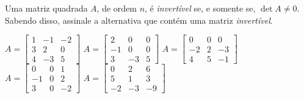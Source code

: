 Uma matriz quadrada $A$, de ordem $n$, é {\it invertível} se, e somente se, $\det A\neq 0$. Sabendo disso, assinale a alternativa que contém uma matriz {\it invertível}.

$A = \left[ \begin{array}{ccc} 1 & -1 & -2\\ 3 & 2 & 0\\ 4 &-3 & 5 \end{array} \right]$
$A = \left[ \begin{array}{ccc}  2 &  0 & 0\\  -1 &  0 &  0\\  3 & -3 &  5 \end{array} \right]$
$A = \left[ \begin{array}{ccc} 0 & 0 & 0\\ -2 & 2 & -3\\ 4 &5 & -1 \end{array} \right]$
$A = \left[ \begin{array}{ccc} 0& 0 & 1\\ -1& 0 & 2\\ 3 & 0 & -2 \end{array} \right]$
$A = \left[ \begin{array}{ccc}  0 &  2 &  6\\  5 &  1 &  3\\ -2 & -3 & -9 \end{array} \right]$








